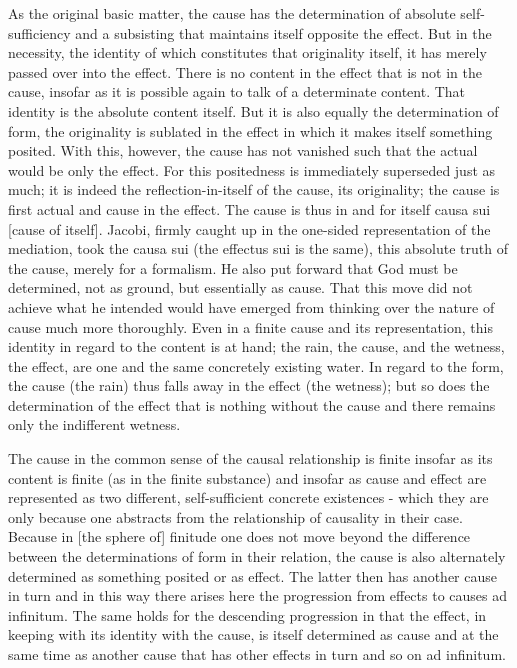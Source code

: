 {    As the original basic matter, the cause has
    the determination of absolute self-sufficiency and
    a subsisting that maintains itself opposite the effect.
    But in the necessity, the identity of which
    constitutes that originality itself,
    it has merely passed over into the effect.
    There is no content in the effect that is not in the cause,
    insofar as it is possible again to talk of a determinate content.
    That identity is the absolute content itself.
    But it is also equally the determination of form,
    the originality is sublated in the effect in which
    it makes itself something posited.
    With this, however, the cause has not vanished such that
    the actual would be only the effect.
    For this positedness is immediately superseded just as much;
    it is indeed the reflection-in-itself of the cause, its originality;
    the cause is first actual and cause in the effect.
    The cause is thus in and for itself causa sui [cause of itself].
    Jacobi, firmly caught up in the one-sided
    representation of the mediation, took the causa sui (the effectus sui is
    the same), this absolute truth of the cause, merely for a formalism.
    He also put forward that God must be determined, not as ground,
    but essentially as cause.
    That this move did not achieve what he
    intended would have emerged from thinking over the nature of
    cause much more thoroughly.
    Even in a finite cause and its representation,
    this identity in regard to the content is at hand;
    the rain, the cause, and the wetness, the effect, are one and the same
    concretely existing water.
    In regard to the form, the cause (the rain) thus
    falls away in the effect (the wetness);
    but so does the determination of the effect
    that is nothing without the cause and
    there remains only the indifferent wetness.

    The cause in the common sense of the causal relationship is finite
    insofar as its content is finite (as in the finite substance) and insofar
    as cause and effect are represented as two different, self-sufficient
    concrete existences - which they are only because one abstracts from
    the relationship of causality in their case. Because in [the sphere
    of] finitude one does not move beyond the difference between the
    determinations of form in their relation, the cause is also alternately
    determined as something posited or as effect. The latter then has
    another cause in turn and in this way there arises here the
    progression from effects to causes ad infinitum. The same holds for
    the descending progression in that the effect, in keeping with its
    identity with the cause, is itself determined as cause and at the same
    time as another cause that has other effects in turn and so on ad
    infinitum.

}
